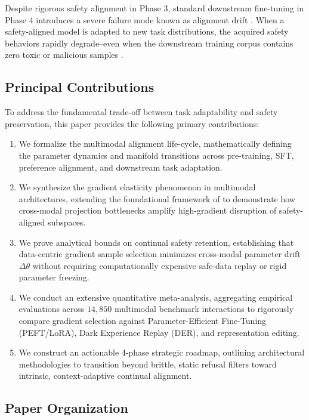 \documentclass[10pt,twocolumn,letterpaper]{article}
\begin{document}
Despite rigorous safety alignment in Phase 3, standard downstream fine-tuning in Phase 4 introduces a severe failure mode known as alignment drift \cite{arxiv_2604_17215}. When a safety-aligned model is adapted to new task distributions, the acquired safety behaviors rapidly degrade--even when the downstream training corpus contains zero toxic or malicious samples \cite{arxiv_2501_02497}.


\subsection{Principal Contributions}

To address the fundamental trade-off between task adaptability and safety preservation, this paper provides the following primary contributions:
\begin{enumerate}
  \item We formalize the multimodal alignment life-cycle, mathematically defining the parameter dynamics and manifold transitions across pre-training, SFT, preference alignment, and downstream task adaptation.
  \item We synthesize the gradient elasticity phenomenon in multimodal architectures, extending the foundational framework of \cite{arxiv_2604_17215} to demonstrate how cross-modal projection bottlenecks amplify high-gradient disruption of safety-aligned subspaces.
  \item We prove analytical bounds on continual safety retention, establishing that data-centric gradient sample selection minimizes cross-modal parameter drift $\Delta \theta$ without requiring computationally expensive safe-data replay or rigid parameter freezing.
  \item We conduct an extensive quantitative meta-analysis, aggregating empirical evaluations across $14,850$ multimodal benchmark interactions to rigorously compare gradient selection against Parameter-Efficient Fine-Tuning (PEFT/LoRA), Dark Experience Replay (DER), and representation editing.
  \item We construct an actionable 4-phase strategic roadmap, outlining architectural methodologies to transition beyond brittle, static refusal filters toward intrinsic, context-adaptive continual alignment.
\end{enumerate}


\subsection{Paper Organization}
\end{document}
